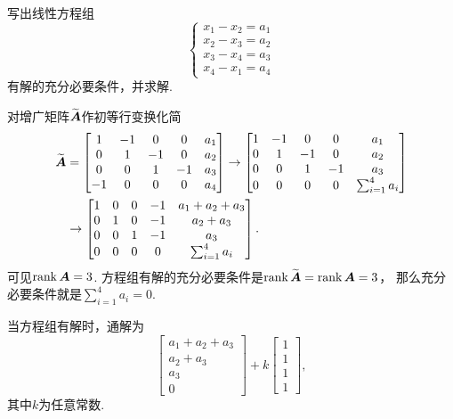 \begin{example}
写出线性方程组\begin{equation*}
	\left\{ \begin{array}{l}
		x_1 - x_2 = a_1 \\
		x_2 - x_3 = a_2 \\
		x_3 - x_4 = a_3 \\
		x_4 - x_1 = a_4
	\end{array} \right.
\end{equation*}有解的充分必要条件，并求解.
\begin{solution}
对增广矩阵\(\widetilde{\boldsymbol{A}}\)作初等行变换化简
\begin{align*}
	\widetilde{\boldsymbol{A}}
	&= \begin{bmatrix}
		1 & -1 & 0 & 0 & a_1 \\
		0 & 1 & -1 & 0 & a_2 \\
		0 & 0 & 1 & -1 & a_3 \\
		-1 & 0 & 0 & 0 & a_4
	\end{bmatrix} \to \begin{bmatrix}
		1 & -1 & 0 & 0 & a_1 \\
		0 & 1 & -1 & 0 & a_2 \\
		0 & 0 & 1 & -1 & a_3 \\
		0 & 0 & 0 & 0 & \sum_{i=1}^4 a_i
	\end{bmatrix} \\
	&\to \begin{bmatrix}
		1 & 0 & 0 & -1 & a_1 + a_2 + a_3 \\
		0 & 1 & 0 & -1 & a_2 + a_3 \\
		0 & 0 & 1 & -1 & a_3 \\
		0 & 0 & 0 & 0 & \sum_{i=1}^4 a_i
	\end{bmatrix}.
\end{align*}
可见\(\rank\boldsymbol{A} = 3\).
方程组有解的充分必要条件是\(\rank\widetilde{\boldsymbol{A}} = \rank\boldsymbol{A} = 3\)，
那么充分必要条件就是\(\sum_{i=1}^4 a_i = 0\).

当方程组有解时，通解为\begin{equation*}
	\begin{bmatrix}
		a_1 + a_2 + a_3 \\ a_2 + a_3 \\ a_3 \\ 0
	\end{bmatrix}
	+ k \begin{bmatrix}
		1 \\ 1 \\ 1 \\ 1
	\end{bmatrix},
\end{equation*}
其中\(k\)为任意常数.
\end{solution}
\end{example}

